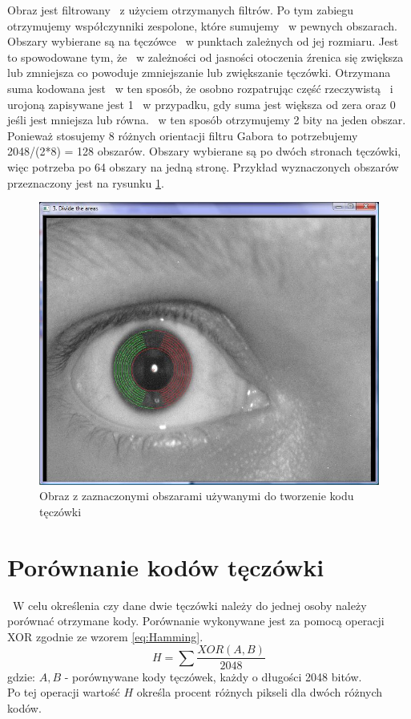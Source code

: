 Obraz jest filtrowany ~z użyciem otrzymanych filtrów. Po tym zabiegu otrzymujemy współczynniki zespolone, które sumujemy ~w pewnych obszarach. Obszary wybierane są na tęczówce ~w punktach zależnych od jej rozmiaru. Jest to spowodowane tym, że ~w zależności od jasności otoczenia źrenica się zwiększa lub zmniejsza co powoduje zmniejszanie lub zwiększanie tęczówki. Otrzymana suma kodowana jest ~w ten sposób, że osobno rozpatrując część rzeczywistą ~i urojoną zapisywane jest 1 ~w przypadku, gdy suma jest większa od zera oraz 0 jeśli jest mniejsza lub równa. ~w ten sposób otrzymujemy 2 bity na jeden obszar. Ponieważ stosujemy 8 różnych orientacji filtru Gabora to potrzebujemy 2048/(2*8) = 128 obszarów. Obszary wybierane są po dwóch stronach tęczówki, więc potrzeba po 64 obszary na jedną stronę. Przykład wyznaczonych obszarów przeznaczony jest na rysunku \ref{fig:obszaryNasze}.

\begin{figure}
\label{fig:obszaryNasze}
\begin{center}
\includegraphics[scale=0.5]{obszary.jpg}
\caption{Obraz z zaznaczonymi obszarami używanymi do tworzenie kodu tęczówki}
\end{center}
\end{figure}

\section{Porównanie kodów tęczówki}
\label{sec:porownanieKodow}
~W celu określenia czy dane dwie tęczówki należy do jednej osoby należy porównać otrzymane kody. Porównanie wykonywane jest za pomocą operacji XOR zgodnie ze wzorem \ref{eq:Hamming}.
\begin{equation}
\label{eq:Hamming}
H = \sum \frac{XOR(A,B)}{2048}
\end{equation}
gdzie:
$A, B$ - porównywane kody tęczówek, każdy o długości 2048 bitów.\\
Po tej operacji wartość $H$ określa procent różnych pikseli dla dwóch różnych kodów.

